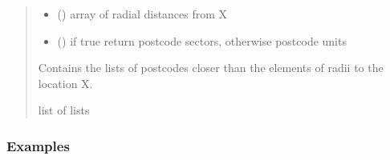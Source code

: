 \documentclass[letterpaper,10pt,english]{sphinxmanual}
\begin{document}
\begin{fulllineitems}
\begin{fulllineitems}
\begin{quote}
\begin{description}
\begin{itemize}
\item {} 
\sphinxAtStartPar
{} () \textendash{} array of radial distances from X

\item {} 
\sphinxAtStartPar
{} (\sphinxstyleliteralemphasis{\sphinxupquote{, }}) \textendash{} if true return postcode sectors, otherwise postcode units

\end{itemize}

\sphinxAtStartPar
Contains the lists of postcodes closer than the elements
of radii to the location X.

\sphinxAtStartPar
list of lists

\end{description}\end{quote}
\subsubsection*{Examples}


\end{fulllineitems}
\end{fulllineitems}
\end{document}
